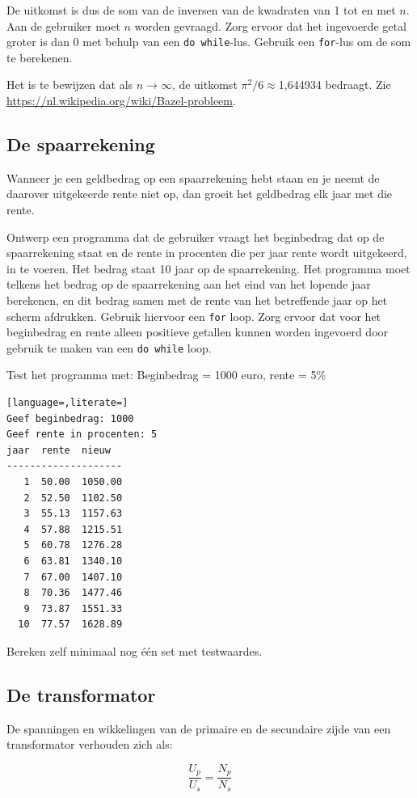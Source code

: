 \documentclass[a4paper,10pt,fleqn,twoside]{article}
\begin{document}
De uitkomst is dus de som van de inversen van de kwadraten van 1 tot en met $n$. Aan de gebruiker moet $n$ worden gevraagd. Zorg ervoor dat het ingevoerde getal groter is dan 0 met behulp van een \lstinline|do while|-lus. Gebruik een \lstinline|for|-lus om de som te berekenen.

Het is te bewijzen dat als $n\longrightarrow\infty$, de uitkomst $\pi^2/6 \approx $1,644934 bedraagt. Zie \url{https://nl.wikipedia.org/wiki/Bazel-probleem}.

\subsection{De spaarrekening}
Wanneer je een geldbedrag op een spaarrekening hebt staan en je neemt de daarover uitgekeerde rente niet op, dan groeit het geldbedrag elk jaar met die rente. 

Ontwerp een programma dat de gebruiker vraagt het beginbedrag dat op de spaarrekening staat en de rente in procenten die per jaar rente wordt uitgekeerd, in te voeren. Het bedrag staat 10 jaar op de spaarrekening. Het programma moet telkens het bedrag op de spaarrekening aan het eind van het lopende jaar berekenen, en dit bedrag samen met de rente van het betreffende jaar op het scherm afdrukken. Gebruik hiervoor een \lstinline|for| loop. Zorg ervoor dat voor het beginbedrag en rente alleen positieve getallen kunnen worden ingevoerd door gebruik te maken van een \lstinline|do while| loop.

Test het programma met: Beginbedrag = 1000 euro, rente = 5\%

\begin{lstlisting}[language=,literate=]
Geef beginbedrag: 1000
Geef rente in procenten: 5
jaar  rente  nieuw
--------------------
   1  50.00  1050.00
   2  52.50  1102.50
   3  55.13  1157.63
   4  57.88  1215.51
   5  60.78  1276.28
   6  63.81  1340.10
   7  67.00  1407.10
   8  70.36  1477.46
   9  73.87  1551.33
  10  77.57  1628.89
\end{lstlisting}

Bereken zelf minimaal nog één set met testwaardes.

\subsection{De transformator}
De spanningen en wikkelingen van de primaire en de secundaire zijde van een transformator verhouden zich als:

\begin{equation*}
\dfrac{U_p}{U_s} = \dfrac{N_p}{N_s}
\end{equation*}
\end{document}
